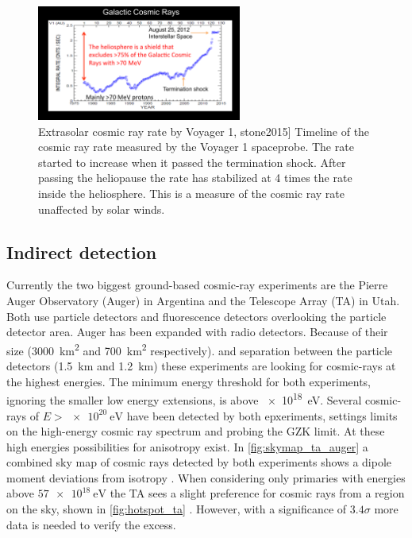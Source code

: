 \begin{figure}
    \centering
    \includegraphics[width=0.6\textwidth]
                    {plots/cosmic-rays/voyager_heliosphere}
    \caption{Extrasolar cosmic ray rate by Voyager 1, stone2015]
Timeline of the cosmic ray rate measured by the Voyager 1 spaceprobe. The rate started to increase when it passed the termination shock. After passing the heliopause the rate has stabilized at 4 times the rate inside the heliosphere. This is a measure of the cosmic ray rate unaffected by solar winds.}
    \label{fig:voyager_heliosphere}
\end{figure}


\subsection{Indirect detection}


Currently the two biggest ground-based cosmic-ray experiments are the Pierre Auger Observatory (Auger) \cite{abraham2004auger} in Argentina and the Telescope Array (TA) \cite{abu-zayyad2012ta} in Utah. Both use particle detectors and fluorescence detectors overlooking the particle detector area. Auger has been expanded with radio detectors. Because of their size (\SI{3000}{\kilo\meter\squared} and \SI{700}{\kilo\meter\squared} respectively). and separation between the particle detectors (\SI{1.5}{\kilo\meter} and \SI{1.2}{\kilo\meter}) these experiments are looking for cosmic-rays at the highest energies. The minimum energy threshold for both experiments, ignoring the smaller low energy extensions, is above \SI{e18}{\eV}. Several cosmic-rays of $E > \SI{e20}{\eV}$ have been detected by both epxeriments, settings limits on the high-energy cosmic ray spectrum and probing the GZK limit. At these high energies possibilities for anisotropy exist. In \cref{fig:skymap_ta_auger} a combined sky map of cosmic rays detected by both experiments shows a dipole moment deviations from isotropy \cite{abbasi2015combined}. When considering only primaries with energies above $\SI{57e18}{\eV}$ the TA sees a slight preference for cosmic rays from a region on the sky, shown in \cref{fig:hotspot_ta} \cite{ta2014hotspot}. However, with a significance of $3.4 \sigma$ more data is needed to verify the excess.

